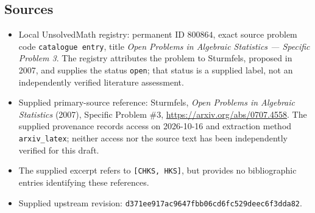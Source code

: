 \documentclass[11pt]{article}
\begin{document}
\subsection{Sources}
\begin{itemize}
\item Local UnsolvedMath registry: permanent ID \(800864\), exact source problem code \texttt{catalogue entry}, title \emph{Open Problems in Algebraic Statistics --- Specific Problem 3}. The registry attributes the problem to Sturmfels, proposed in 2007, and supplies the status \texttt{open}; that status is a supplied label, not an independently verified literature assessment.
\item Supplied primary-source reference: Sturmfels, \emph{Open Problems in Algebraic Statistics} (2007), Specific Problem \(\#3\), \url{https://arxiv.org/abs/0707.4558}. The supplied provenance records access on 2026-10-16 and extraction method \texttt{arxiv\_latex}; neither access nor the source text has been independently verified for this draft.
\item The supplied excerpt refers to \texttt{[CHKS, HKS]}, but provides no bibliographic entries identifying these references.
\item Supplied upstream revision: \texttt{d371ee917ac9647fbb06cd6fc529deec6f3dda82}.
\end{itemize}
\end{document}
